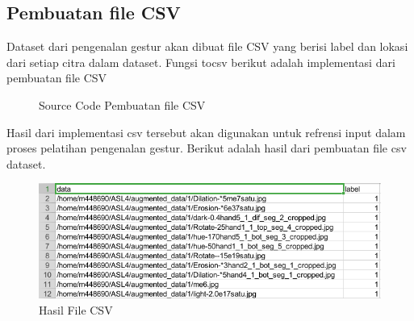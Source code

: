 \subsection{Pembuatan file CSV}
Dataset dari pengenalan gestur akan dibuat file CSV yang berisi label dan lokasi dari setiap citra dalam dataset. Fungsi tocsv berikut adalah implementasi dari pembuatan file CSV
\begin{figure}[H]
	\centering
	
	\caption{Source Code Pembuatan file CSV}
\end{figure}
Hasil dari implementasi csv tersebut akan digunakan untuk refrensi input dalam proses pelatihan pengenalan gestur. Berikut adalah hasil dari pembuatan file csv dataset.
\begin{figure}[H]
	\centering
	\includegraphics[width=0.7\linewidth]{csv}
	\caption{Hasil File CSV}
	\label{fig:csv}
\end{figure}
